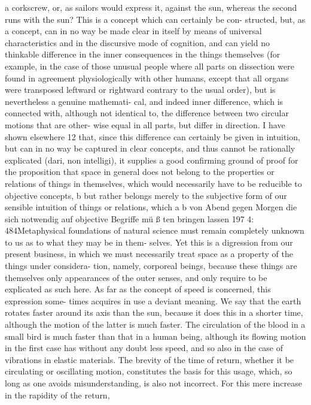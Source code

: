 a corkscrew, or, as sailors would express it, against the sun, whereas the
second runs with the sun? This is a concept which can certainly be con-
structed, but, as a concept, can in no way be made clear in itself by means
of universal characteristics and in the discursive mode of cognition, and
can yield no thinkable difference in the inner consequences in the things
themselves (for example, in the case of those unusual people where all
parts on dissection were found in agreement physiologically with other
humans, except that all organs were transposed leftward or rightward
contrary to the usual order), but is nevertheless a genuine mathemati-
cal, and indeed inner difference, which is connected with, although not
identical to, the difference between two circular motions that are other-
wise equal in all parts, but differ in direction. I have shown elsewhere 12
that, since this difference can certainly be given in intuition, but can
in no way be captured in clear concepts, and thus cannot be rationally
explicated (dari, non intelligi), it supplies a good conﬁrming ground of
proof for the proposition that space in general does not belong to the
properties or relations of things in themselves, which would necessarily
have to be reducible to objective concepts, b but rather belongs merely to
the subjective form of our sensible intuition of things or relations, which
a
b
von Abend gegen Morgen
die sich notwendig auf objective Begriffe mü ß ten bringen lassen
197
4: 484Metaphysical foundations of natural science
must remain completely unknown to us as to what they may be in them-
selves. Yet this is a digression from our present business, in which we
must necessarily treat space as a property of the things under considera-
tion, namely, corporeal beings, because these things are themselves only
appearances of the outer senses, and only require to be explicated as such
here. As far as the concept of speed is concerned, this expression some-
times acquires in use a deviant meaning. We say that the earth rotates
faster around its axis than the sun, because it does this in a shorter time,
although the motion of the latter is much faster. The circulation of the
blood in a small bird is much faster than that in a human being, although
its ﬂowing motion in the ﬁrst case has without any doubt less speed, and
so also in the case of vibrations in elastic materials. The brevity of the
time of return, whether it be circulating or oscillating motion, constitutes
the basis for this usage, which, so long as one avoids misunderstanding,
is also not incorrect. For this mere increase in the rapidity of the return,
